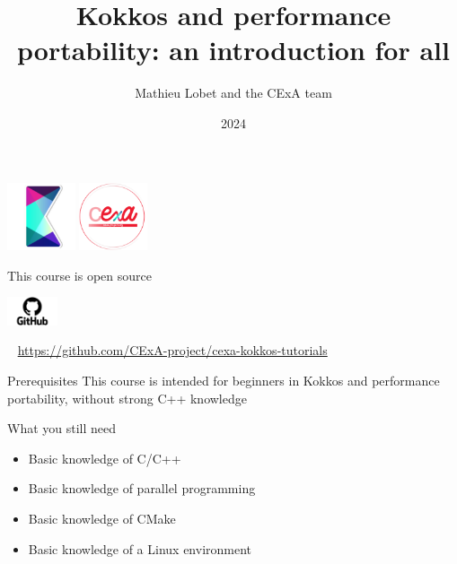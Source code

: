 \documentclass[aspectratio=169]{beamer}
\title{Kokkos and performance portability: an introduction for all}
\author{Mathieu Lobet and the CExA team}
\institute{CEA}
\date{2024}
\newcommand{\githublink}[2][2em]{%
    \hspace{-0.25em}%
    \parbox[c][#1][c]{#1}{%
        \includegraphics[width=#1]{GitHub-logo.png}%
    }%
    \hspace{-0.25em}%
    ~%
    #2%
}
\begin{document}
\begin{frame}{}
    \titlepage
    \begin{center}
        \includegraphics[width=0.15\textwidth]{kokkos.png}%
        \hspace{2em}%
        \includegraphics[width=0.15\textwidth]{cexa_logo.png}
    \end{center}
\end{frame}


\begin{frame}{This course is open source}
    \begin{center}
        \githublink[4em]{\url{https://github.com/CExA-project/cexa-kokkos-tutorials}}
    \end{center}
\end{frame}


\begin{frame}{Prerequisites}
    This course is intended for beginners in Kokkos and performance portability, without strong C++ knowledge

    \begin{block}{What you still need}
        \begin{itemize}
            \item Basic knowledge of C/C++
            \item Basic knowledge of parallel programming
            \item Basic knowledge of CMake
            \item Basic knowledge of a Linux environment
        \end{itemize}
    \end{block}
\end{frame}

\end{document}
